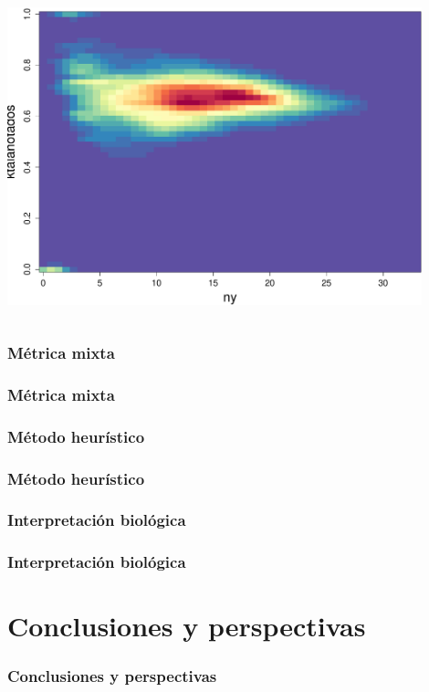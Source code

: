 \documentclass[serif,9pt, t]{beamer}
\begin{document}
\begin{frame}
\begin{columns}[T]
    \centering    
    \includegraphics[width=0.90\textwidth]{lktaanotados_vs_nyanotados.pdf}
\end{columns}
\end{frame}

\subsubsection*{Métrica mixta}
\begin{frame}
\frametitle{Métrica mixta} 
\end{frame}
\subsubsection*{Método heurístico}
\begin{frame}
\frametitle{Método heurístico} 
\end{frame}
\subsubsection*{Interpretación biológica}
\begin{frame}
\frametitle{Interpretación biológica} 
\end{frame}
\section{Conclusiones y perspectivas}
\begin{frame}
\frametitle{Conclusiones y perspectivas} 
\end{frame}
\end{document}
